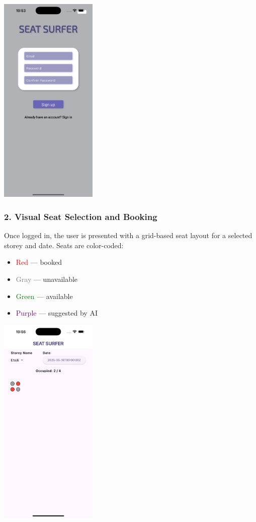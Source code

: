 \documentclass[12pt,a4paper]{report} %
\begin{document}
\begin{center}
\includegraphics[width=0.35\textwidth]{images/login_screen.png}
\end{center}

\subsubsection*{2. Visual Seat Selection and Booking}

Once logged in, the user is presented with a grid-based seat layout for a selected storey and date. Seats are color-coded:

\begin{itemize}
\item \textcolor{red}{Red} — booked
\item \textcolor{gray}{Gray} — unavailable
\item \textcolor{green}{Green} — available
\item \textcolor{purple}{Purple} — suggested by AI
\end{itemize}

\begin{center}
\includegraphics[width=0.35\textwidth]{images/Simulator Screenshot - iPhone 16 Pro Max - 2025-05-19 at 19.56.13.png}
\end{center}
\end{document}
